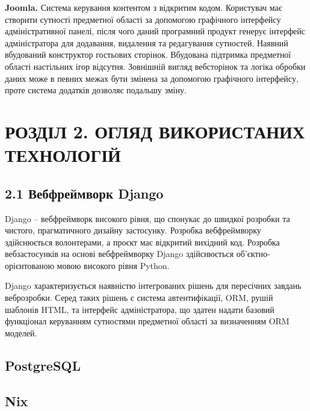 \documentclass[a4paper, 14pt]{extarticle}
\begin{document}
  \textbf{Joomla.} Система керування контентом з відкритим кодом.
  Користувач має створити сутності предметної області за допомогою графічного
  інтерфейсу адміністративної панелі, після
  чого даний програмний продукт генерує інтерфейс адміністратора для додавання, видалення
  та редагування сутностей. Наявний вбудований конструктор гостьових сторінок.
  Вбудована підтримка предметної області настільних ігор відсутня. Зовнішній вигляд
  вебсторінок та логіка обробки даних може в певних межах бути змінена за допомогою
  графічного інтерфейсу, проте система додатків дозволяє подальшу зміну.


  \section{РОЗДІЛ 2. ОГЛЯД ВИКОРИСТАНИХ ТЕХНОЛОГІЙ}

  \subsection{2.1 Вебфреймворк Django}
  Django -- вебфреймворк високого рівня, що спонукає до швидкої розробки та чистого,
  прагматичного дизайну застосунку. Розробка вебфреймворку здійснюється волонтерами,
  а проєкт має відкритий вихідний код. Розробка вебзастосунків на основі
  вебфреймворку Django здійснюється об'єктно-орієнтованою мовою високого рівня Python.

  Django характеризується наявністю інтегрованих рішень для пересічних завдань
  веброзробки. Серед таких рішень є система автентифікації, ORM, рушій шаблонів HTML,
  та інтерфейс адміністратора, що здатен надати базовий функціонал керуванням
  сутностями предметної області за визначенням ORM моделей.

  \subsection{PostgreSQL}

  \subsection{Nix}
\end{document}
